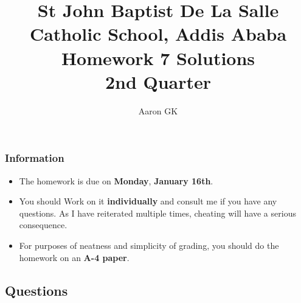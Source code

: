 \documentclass[9pt,addpoints]{exam}
\author{Aaron GK}
\begin{document}
	\title{St John Baptist De La Salle Catholic School, Addis Ababa\\
		\large Homework 7 Solutions\\
		2nd Quarter}
	\maketitle
	\begin{center}
		\subsubsection*{Information}
		\begin{itemize}
			\item The homework is due on \textbf{Monday}, \textbf{January 16th}.
			\item You should Work on it \textbf{individually} and consult me if you have any questions. As I have reiterated multiple times, cheating will have a serious consequence.
			\item For purposes of neatness and simplicity of grading, you should do the homework on an \textbf{A-4 paper}.
		\end{itemize}
	\end{center}
	\begin{center}
		\subsection*{Questions}
	\end{center}
	
\end{document}

